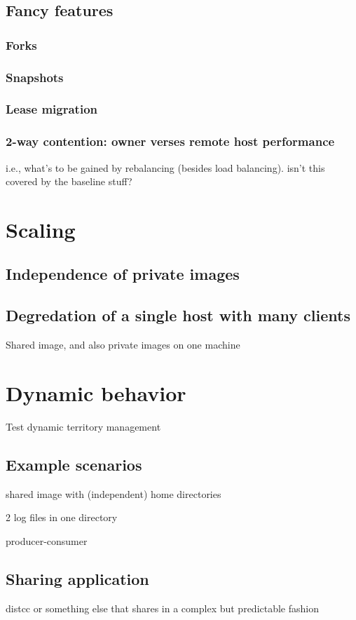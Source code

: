 \subsection{Fancy features}
\subsubsection{Forks}
\subsubsection{Snapshots}
\subsubsection{Lease migration}
\subsubsection{2-way contention: owner verses remote host performance}
i.e., what's to be gained by rebalancing (besides load balancing). isn't this covered by the baseline stuff?

\section{Scaling}
\subsection{Independence of private images}
\subsection{Degredation of a single host with many clients}
Shared image, and also private images on one machine

\section{Dynamic behavior}

Test dynamic territory management

\subsection{Example scenarios}

shared image with (independent) home directories

2 log files in one directory

producer-consumer

\subsection{Sharing application}
distcc or something else that shares in a complex but predictable fashion

